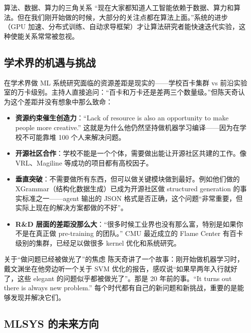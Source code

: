 \documentclass[a4paper]{article}
\begin{document}
\begin{importantbox}{算法、数据、算力的三角关系}
``现在大家都知道人工智能依赖于数据、算力和算法。但在我们刚开始做的时候，大部分的关注点都在算法上面。''系统的进步（GPU 加速、分布式训练、自动求导框架）才让算法研究者能快速迭代实验，这种使能关系常常被忽视。
\end{importantbox}

\subsection{学术界的机遇与挑战}

在学术界做 ML 系统研究面临的资源差距是现实的------学校百卡集群 vs 前沿实验室的万卡级别。主持人直接追问：``百卡和万卡还是差两三个数量级。''但陈天奇认为这个差距并没有想象中那么致命：

\begin{itemize}
    \item \textbf{资源约束催生创造力}：``Lack of resource is also an opportunity to make people more creative.'' 这就是为什么他仍然坚持做机器学习编译------因为在学校不可能靠堆 100 个人来解决问题。
    \item \textbf{开源社区合作}：学校不能是一个个体，需要做出能让开源社区共建的工作。像 VRL、Magiline 等成功的项目都有高校因子。
    \item \textbf{垂直突破}：不需要做所有东西，但可以做关键模块做到最好。例如他们做的 XGrammar（结构化数据生成）已成为开源社区做 structured generation 的事实标准之一------agent 输出的 JSON 格式是否正确，这个问题``非常重要，但实际上现在的解决方案都做的不好''。
    \item \textbf{R\&D 层面的差距没那么大}：``很多时候工业界也没有那么富，特别是如果你不是在真正做 pre-training 的团队。'' CMU 最近成立的 Flame Center 有百卡级别的集群，已经足以做很多 kernel 优化和系统研究。
\end{itemize}

\begin{warningbox}{关于``做问题已经被做光了''的焦虑}
陈天奇讲了一个故事：刚开始做机器学习时，戴文渊坐在他旁边听一个关于 SVM 优化的报告，感叹说``如果早两年入行就好了，这些 elegant 的问题似乎都被做光了''。那是 20 年前的事。``It turns out there is always new problem.'' 每个时代都有自己的新问题和新挑战，重要的是能够发现并解决它们。
\end{warningbox}

\subsection{MLSYS 的未来方向}
\end{document}
